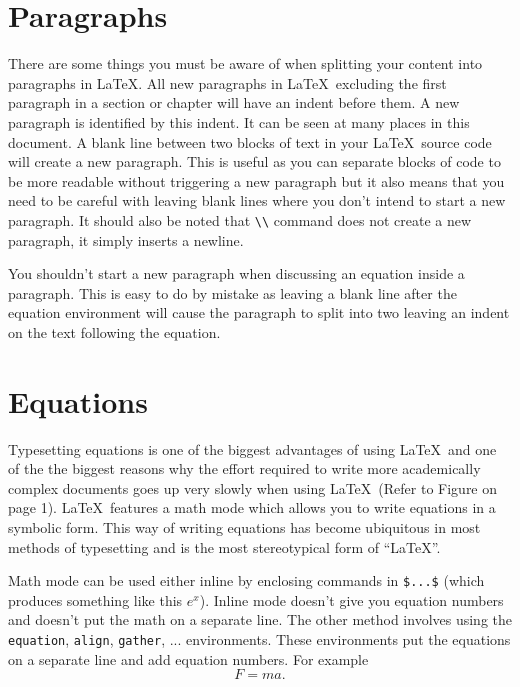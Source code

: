 \documentclass[english,10pt,a4paper, openany, oneside]{book}
\begin{document}
	\section{Paragraphs}
	There are some things you must be aware of when splitting your content into paragraphs in \LaTeX. All new paragraphs in \LaTeX\ excluding the first paragraph in a section or chapter will have an indent before them. A new paragraph is identified by this indent. It can be seen at many places in this document. A blank line between two blocks of text in your \LaTeX\ source code will create a new paragraph. This is useful as you can separate blocks of code to be more readable without triggering a new paragraph but it also means that you need to be careful with leaving blank lines where you don't intend to start a new paragraph. It should also be noted that \verb*|\\| command does not create a new paragraph, it simply inserts a newline.
	
	{\reversemarginpar{}}You shouldn't start a new paragraph when discussing an equation inside a paragraph. This is easy to do by mistake as leaving a blank line after the equation environment will cause the paragraph to split into two leaving an indent on the text following the equation. 
	
	\section{Equations}\label{sec:equations}
	Typesetting equations is one of the biggest advantages of using \LaTeX\ and one of the the biggest reasons why the effort required to write more academically complex documents goes up very slowly when using \LaTeX\ (Refer to Figure on page 1). \LaTeX\ features a math mode which allows you to write equations in a symbolic form. This way of writing equations has become ubiquitous in most methods of typesetting and is the most stereotypical form of ``\LaTeX''.
	
	Math mode can be used either inline by enclosing commands in \verb*|$...$| (which produces something like this $e^x$). Inline mode doesn't give you equation numbers and doesn't put the math on a separate line. The other method involves using the \texttt{equation}, \texttt{align}, \texttt{gather}, ... environments. These environments put the equations on a separate line and add equation numbers. For example
	\begin{equation}
		F = ma.
	\end{equation}
	
\end{document}
